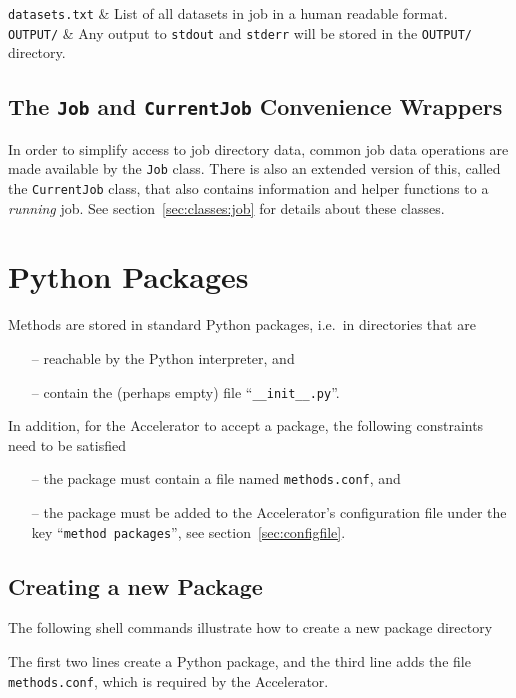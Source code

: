 \texttt{datasets.txt} & List of all datasets in job in a human
readable format.\\

\texttt{OUTPUT/} & Any output to \texttt{stdout} and \texttt{stderr} will be
stored in the \texttt{OUTPUT/} directory.\\
\stoptabletwo



\subsection{The \texttt{Job} and \texttt{CurrentJob} Convenience Wrappers}
In order to simplify access to job directory data, common job data
operations are made available by the \texttt{Job} class.  There is
also an extended version of this, called the \texttt{CurrentJob}
class, that also contains information and helper functions to a
\textsl{running} job.  See section~\ref{sec:classes:job} for details about
these classes.



\section{Python Packages}
Methods are stored in standard Python packages, i.e.\ in directories
that are
\begin{itemize}
\item[--] reachable by the Python interpreter, and
\item[--] contain the (perhaps empty) file ``\texttt{\_\_init\_\_.py}''.
\end{itemize}
In addition, for the Accelerator to accept a package, the following
constraints need to be satisfied
\begin{itemize}
\item[--] the package must contain a file named \texttt{methods.conf}, and
\item[--] the package must be added to the Accelerator's configuration file under the key ``\texttt{method packages}'', see section~\ref{sec:configfile}.
\end{itemize}



\subsection{Creating a new Package}
The following shell commands illustrate how to create a new package
directory
\begin{shell}
\end{shell}
The first two lines create a Python package, and the third line adds
the file \texttt{methods.conf}, which is required by the Accelerator.


